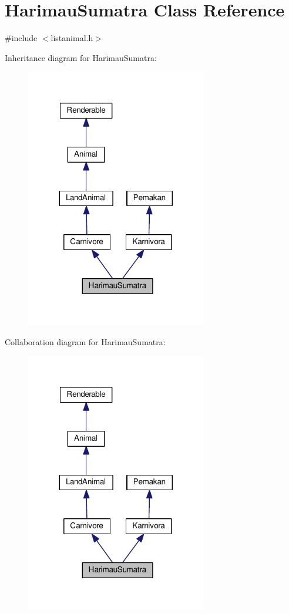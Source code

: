\hypertarget{classHarimauSumatra}{}\section{Harimau\+Sumatra Class Reference}
\label{classHarimauSumatra}


{\ttfamily \#include $<$listanimal.\+h$>$}



Inheritance diagram for Harimau\+Sumatra\+:
\nopagebreak
\begin{figure}[H]
\begin{center}
\leavevmode
\includegraphics[width=224pt]{classHarimauSumatra__inherit__graph}
\end{center}
\end{figure}


Collaboration diagram for Harimau\+Sumatra\+:
\nopagebreak
\begin{figure}[H]
\begin{center}
\leavevmode
\includegraphics[width=224pt]{classHarimauSumatra__coll__graph}
\end{center}
\end{figure}
